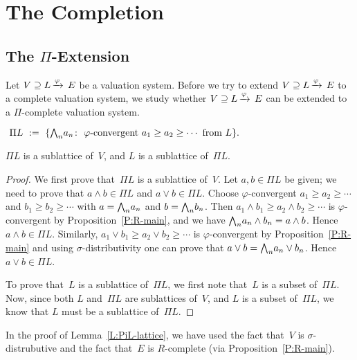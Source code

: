 \documentclass[main.tex]{subfiles}
\begin{document}
\section{The Completion}
\label{S:completion}
%
%

\subsection{The $\Pi$-Extension}
Let $V \supseteq L\,\smash{\xrightarrow{\varphi}\,E}$ be a valuation system.
Before we try to extend $V \supseteq L\,\smash{\xrightarrow{\varphi}\,E}$ to a complete
valuation system, 
we study whether $V \supseteq L\,\smash{\xrightarrow{\varphi}\,E}$
can be extended to a $\Pi$-complete valuation system.

\begin{dfn}
\label{D:PiL}
$\ \Pi L \ \eqdf \ \{ 
\bw_n a_n \colon \ \text{$\varphi$-convergent }
 a_1\geq a_2 \geq\dotsb \text{ from $L$} \}.$
\end{dfn}
%
%
\begin{lem}
\label{L:PiL-lattice}
$\Pi L$ is a sublattice of~$V$,
and $L$ is a sublattice of~$\Pi L$.
\end{lem}
\begin{proof}
We first prove that~$\Pi L$ is a sublattice of~$V$.
Let $a,b\in \Pi L$ be given;
we need to prove that $a\wedge b \in \Pi L$
and $a \vee b \in \Pi L$.
Choose $\varphi$-convergent 
$a_1 \geq a_2 \geq\dotsb$ and
$b_1 \geq b_2 \geq\dotsb$
with $a = \textstyle{\bigwedge}_n a_n$ and  $b=\textstyle{\bigwedge}_n b_n$.
Then $a_1 \wedge b_1 \geq a_2 \wedge b_2 \geq \dotsb$
is $\varphi$-convergent by Proposition~\ref{P:R-main},
and we have $\textstyle{\bigwedge}_n a_n \wedge b_n = a\wedge b$.
Hence $a\wedge b \in \Pi L$.
Similarly,
$a_1 \vee b_1 \geq a_2 \vee b_2 \geq \dotsb$
is $\varphi$-convergent by Proposition~\ref{P:R-main}
and
using $\sigma$-distributivity 
one can prove that $a \vee b  =\textstyle{\bigwedge}_n a_n \vee b_n$.
Hence $a\vee b \in \Pi L$.

To prove that~$L$ is a sublattice of~$\Pi L$,
we first note that~$L$ is a subset of~$\Pi L$.
Now,
since both $L$ and~$\Pi L$ are sublattices of~$V$,
and $L$ is a subset of~$\Pi L$,
we know that $L$ must be a sublattice of~$\Pi L$.
\end{proof}
\begin{rem}
In the proof of Lemma~\ref{L:PiL-lattice},
we have used the fact that~$V$ is $\sigma$-distrubutive
and the fact that~$E$ is $R$-complete
(via Proposition~\ref{P:R-main}).
\end{rem}
\end{document}
